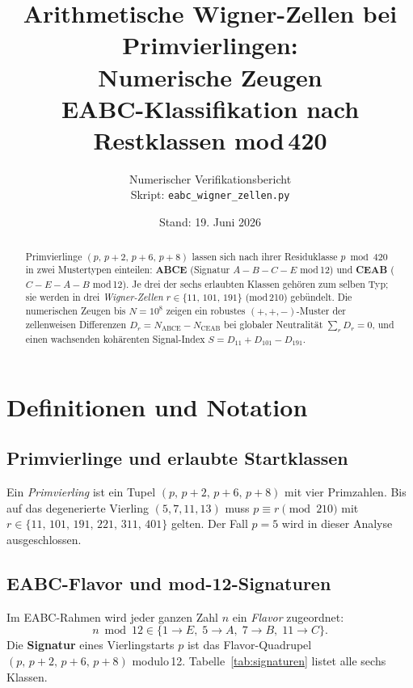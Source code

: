 \documentclass[12pt, a4paper]{article}
\title{\textbf{Arithmetische Wigner-Zellen bei Primvierlingen:\\
Numerische Zeugen}\\[0.5em]
{\large EABC-Klassifikation nach Restklassen mod\,420}}
\author{Numerischer Verifikationsbericht\\
\small Skript: \texttt{eabc\_wigner\_zellen.py}}
\date{Stand: 19. Juni 2026}
\begin{document}
\maketitle
\thispagestyle{empty}

\begin{abstract}
Primvierlinge $(p,\,p{+}2,\,p{+}6,\,p{+}8)$ lassen sich nach ihrer Residuklasse
$p \bmod 420$ in zwei Mustertypen einteilen: \textbf{ABCE} (Signatur $A{-}B{-}C{-}E$
mod\,12) und \textbf{CEAB} ($C{-}E{-}A{-}B$ mod\,12). Je drei der sechs erlaubten
Klassen gehören zum selben Typ; sie werden in drei \emph{Wigner-Zellen}
$r \in \{11,\,101,\,191\}$ (mod\,210) gebündelt. Die numerischen Zeugen bis
$N = 10^8$ zeigen ein robustes $(+,+,-)$-Muster der zellenweisen Differenzen
$D_r = N_{\text{ABCE}} - N_{\text{CEAB}}$ bei globaler Neutralität $\sum_r D_r = 0$,
und einen wachsenden kohärenten Signal-Index $S = D_{11} + D_{101} - D_{191}$.
\end{abstract}

\tableofcontents
\newpage

\section{Definitionen und Notation}

\subsection{Primvierlinge und erlaubte Startklassen}

Ein \emph{Primvierling} ist ein Tupel $(p,\,p{+}2,\,p{+}6,\,p{+}8)$ mit
vier Primzahlen. Bis auf das degenerierte Vierling $(5,7,11,13)$ muss
$p \equiv r \pmod{210}$ mit $r \in \{11,\,101,\,191,\,221,\,311,\,401\}$ gelten.
Der Fall $p = 5$ wird in dieser Analyse ausgeschlossen.

\subsection{EABC-Flavor und mod-12-Signaturen}

Im EABC-Rahmen wird jeder ganzen Zahl $n$ ein \emph{Flavor} zugeordnet:
\[
   n \bmod 12 \in \{1 \to E,\; 5 \to A,\; 7 \to B,\; 11 \to C\}.
\]
Die \textbf{Signatur} eines Vierlingstarts $p$ ist das Flavor-Quadrupel
$(p,\,p{+}2,\,p{+}6,\,p{+}8)$ modulo\,12. Tabelle~\ref{tab:signaturen} listet
alle sechs Klassen.
\end{document}
